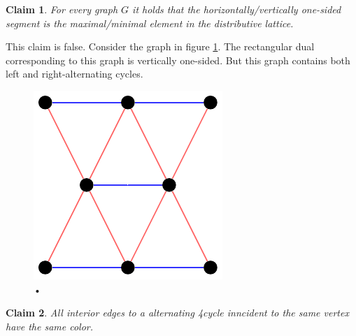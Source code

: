 \documentclass[a4paper]{article}
\newtheorem{claim}{Claim}
\begin{document}
\begin{claim}
For every graph $G$ it holds that the horizontally/vertically one-sided segment is the maximal/minimal element in the distributive lattice.
\end{claim}

This claim is false. Consider the graph in figure \ref{fig:disproofhorvertmaxmin}. The rectangular dual corresponding to this graph is vertically one-sided. But this graph contains both left and right-alternating cycles.

\begin{figure}[h!]
\centering
\includegraphics{disproofhorvertmaxmin}

\caption{• 
    \label{fig:disproofhorvertmaxmin}}
\end{figure}

\begin{claim}
All interior edges to a alternating 4cycle inncident to the same vertex have the same color.
\end{claim}
\end{document}
